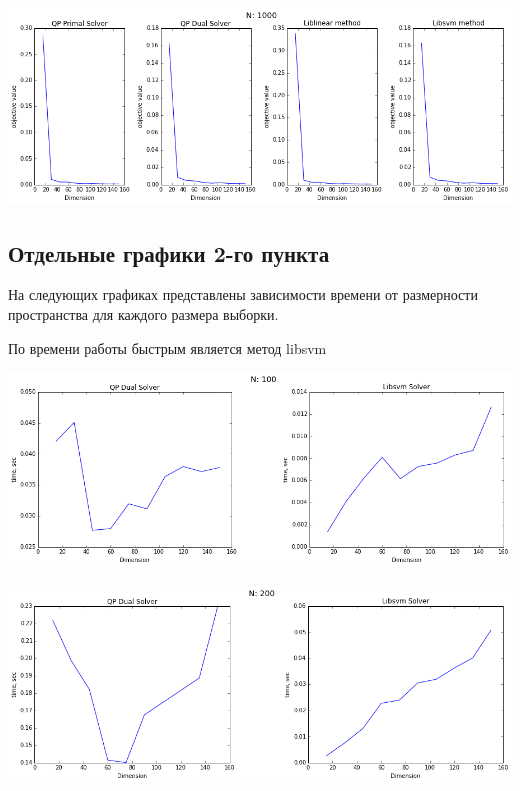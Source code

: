 \documentclass[12pt, a4paper]{article}
\begin{document}
			\begin{center}
				\includegraphics[width=18cm]{1par_obj_N1000.png}
			\end{center}

		\newpage
		\subsection{Отдельные графики 2-го пункта}
			На следующих графиках представлены зависимости времени от размерности пространства для каждого размера выборки.

			По времени работы быстрым является метод libsvm

			\begin{center}
				\includegraphics[width=18cm]{2par_N100.png}
			\end{center}

			\begin{center}
				\includegraphics[width=18cm]{2par_N200.png}
			\end{center}
\end{document}

